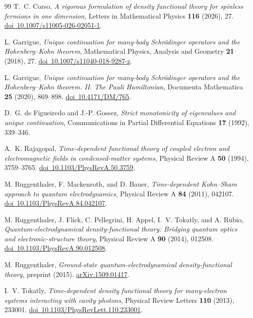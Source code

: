 \documentclass[final,reqno]{amsart}
\theoremstyle{remark}
\begin{document}
\begin{thebibliography}{99}
T.~C. Corso,
\emph{A rigorous formulation of density functional theory for spinless
fermions in one dimension},
Letters in Mathematical Physics \textbf{116} (2026), 27.
\href{https://doi.org/10.1007/s11005-026-02051-1}{doi\ 10.1007/s11005-026-02051-1}.

L. Garrigue,
\emph{Unique continuation for many-body Schr\"odinger operators and the
Hohenberg--Kohn theorem},
Mathematical Physics, Analysis and Geometry \textbf{21} (2018), 27.
\href{https://doi.org/10.1007/s11040-018-9287-z}{doi\ 10.1007/s11040-018-9287-z}.

L. Garrigue,
\emph{Unique continuation for many-body Schr\"odinger operators and the
Hohenberg--Kohn theorem. II. The Pauli Hamiltonian},
Documenta Mathematica \textbf{25} (2020), 869--898.
\href{https://doi.org/10.4171/DM/765}{doi\ 10.4171/DM/765}.

D.~G. de Figueiredo and J.-P. Gossez,
\emph{Strict monotonicity of eigenvalues and unique continuation},
Communications in Partial Differential Equations \textbf{17} (1992),
339--346.

A.~K. Rajagopal,
\emph{Time-dependent functional theory of coupled electron and
electromagnetic fields in condensed-matter systems},
Physical Review A \textbf{50} (1994), 3759--3765.
\href{https://doi.org/10.1103/PhysRevA.50.3759}{doi\ 10.1103/PhysRevA.50.3759}.

M. Ruggenthaler, F. Mackenroth, and D. Bauer,
\emph{Time-dependent Kohn--Sham approach to quantum electrodynamics},
Physical Review A \textbf{84} (2011), 042107.
\href{https://doi.org/10.1103/PhysRevA.84.042107}{doi\ 10.1103/PhysRevA.84.042107}.

M. Ruggenthaler, J. Flick, C. Pellegrini, H. Appel, I.~V. Tokatly, and
A. Rubio,
\emph{Quantum-electrodynamical density-functional theory: Bridging
quantum optics and electronic-structure theory},
Physical Review A \textbf{90} (2014), 012508.
\href{https://doi.org/10.1103/PhysRevA.90.012508}{doi\ 10.1103/PhysRevA.90.012508}.

M. Ruggenthaler,
\emph{Ground-state quantum-electrodynamical density-functional theory},
preprint (2015).
\href{https://arxiv.org/abs/1509.01417}{arXiv:1509.01417}.

I.~V. Tokatly,
\emph{Time-dependent density functional theory for many-electron
systems interacting with cavity photons},
Physical Review Letters \textbf{110} (2013), 233001.
\href{https://doi.org/10.1103/PhysRevLett.110.233001}{doi\ 10.1103/PhysRevLett.110.233001}.


\end{thebibliography}
\end{document}
